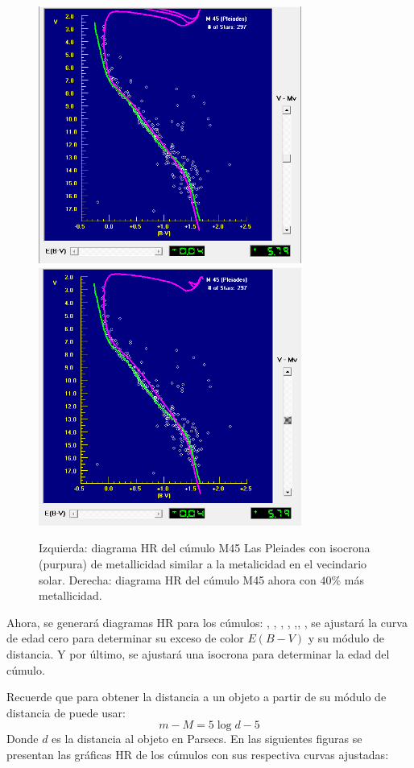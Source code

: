 \documentclass[12pt]{article}
\begin{document}
\begin{figure}[H]
    \includegraphics[width= 3.40in]{plea2.png}
    \includegraphics[width= 3.40in]{plea3.png}
  \caption{Izquierda: diagrama HR del cúmulo M45 Las Pleiades con isocrona (purpura) de metallicidad similar a la metalicidad en el vecindario solar. Derecha: diagrama HR del cúmulo M45 ahora con $40\%$ más metallicidad.}
  \label{hriso}
\end{figure}

Ahora, se generará diagramas HR para los cúmulos: , , , , ,,  , se ajustará la curva de edad cero para determinar su exceso de color $E(B-V)$ y su módulo de distancia. Y por último, se ajustará una isocrona para determinar la edad del cúmulo. 

Recuerde que para obtener la distancia a un objeto a partir de su módulo de distancia de puede usar:
\begin{equation}
m- M = 5\log{d} - 5    
\end{equation}
Donde $d$ es la distancia al objeto en Parsecs.
En las siguientes figuras se presentan las gráficas HR de los cúmulos con sus respectiva curvas ajustadas:
\newpage
\end{document}
